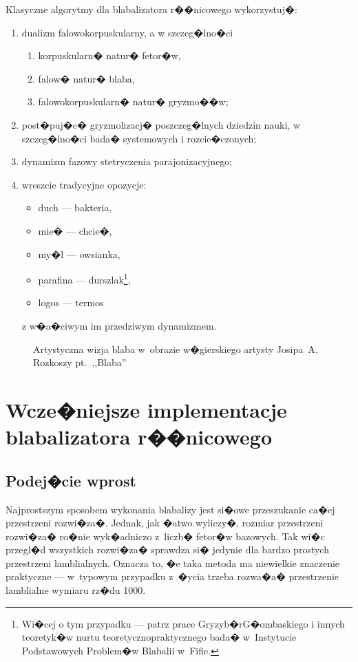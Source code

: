 \documentclass[licencjacka]{pracamgr}
\begin{document}
Klasyczne algorytmy dla blabalizatora r��nicowego wykorzystuj�:
\begin{enumerate}
\item dualizm falowo\dywiz korpuskularny, a w szczeg�lno�ci
  \begin{enumerate}
  \item korpuskularn� natur� fetor�w,
  \item falow� natur� blaba,
  \item falowo\dywiz korpuskularn� natur� gryzmo��w;
  \end{enumerate}
\item post�puj�c� gryzmolizacj� poszczeg�lnych dziedzin nauki, w
  szczeg�lno�ci bada� systemowych i rozcie�czonych;
\item dynamizm fazowy stetryczenia parajonizacyjnego;
\item wreszcie tradycyjne opozycje:
  \begin{itemize}
  \item duch --- bakteria,
  \item mie� --- chcie�,
  \item my�l --- owsianka,
  \item parafina --- durszlak\footnote{Wi�cej o tym przypadku --- patrz
      prace Gryzyb�r\dywiz G�ombaskiego i innych teoretyk�w nurtu
      teoretyczno\dywiz praktycznego bada� w~Instytucie Podstawowych
      Problem�w Blabalii w~Fifie.},
  \item logos --- termos%
  \end{itemize}
  z w�a�ciwym im przedziwym dynamizmem.
\end{enumerate}

\begin{figure}[tp]
  \centering
  \caption{Artystyczna wizja blaba w~obrazie w�gierskiego artysty
    Josipa~A. Rozkoszy pt.~,,Blaba''}
\end{figure}

\chapter{Wcze�niejsze implementacje blabalizatora
  r��nicowego}\label{r:losers}

\section{Podej�cie wprost}

Najprostszym sposobem wykonania blabalizy jest si�owe przeszukanie
ca�ej przestrzeni rozwi�za�.  Jednak, jak �atwo wyliczy�, rozmiar
przestrzeni rozwi�za� ro�nie wyk�adniczo z~liczb� fetor�w bazowych.
Tak wi�c przegl�d wszystkich rozwi�za� sprawdza si� jedynie dla bardzo
prostych przestrzeni lamblialnych.  Oznacza to, �e taka metoda ma
niewielkie znaczenie praktyczne --- w~typowym przypadku z~�ycia trzeba
rozwa�a� przestrzenie lamblialne wymiaru rz�du 1000.
\end{document}
